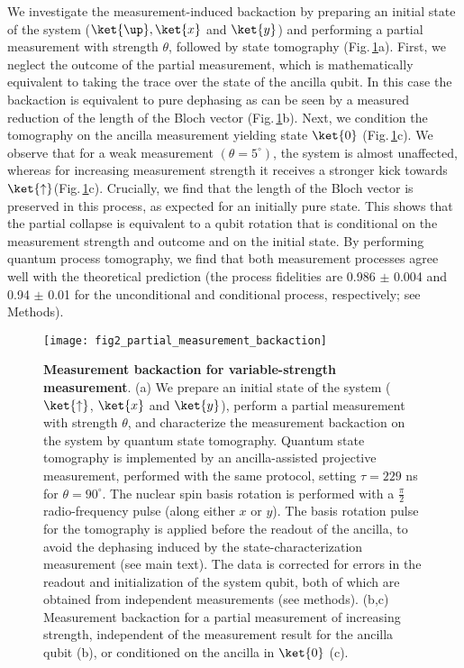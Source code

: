 We investigate the measurement-induced backaction by preparing an initial state of the system ($\ket{\up},\ket{x}$ and $\ket{y}$) and performing a partial measurement with strength $\theta$, followed by state tomography (Fig.\,\ref{fig:amc-fig2}a). First, we neglect the outcome of the partial measurement, which is mathematically equivalent to taking the trace over the state of the ancilla qubit. In this case the backaction is equivalent to pure dephasing as can be seen by a measured reduction of the length of the Bloch vector (Fig.\,\ref{fig:amc-fig2}b). Next, we condition the tomography on the ancilla measurement yielding state $\ket{0}$ (Fig.\,\ref{fig:amc-fig2}c). We observe that for a weak measurement $(\theta = 5^{\circ})$, the system is almost unaffected, whereas for increasing measurement strength it receives a stronger kick towards $\ket{\uparrow} $(Fig.\,\ref{fig:amc-fig2}c). Crucially, we find that the length of the Bloch vector is preserved in this process, as expected for an initially pure state. This shows that the partial collapse is equivalent to a qubit rotation that is conditional on the measurement strength and outcome and on the initial state. By performing quantum process tomography, we find that both measurement processes agree well with the theoretical prediction (the process fidelities are 0.986 $\pm$ 0.004 and 0.94 $\pm$ 0.01 for the unconditional and conditional process, respectively; see Methods).


\begin{figure}
	\centering
	\texttt{[image: fig2\_partial\_measurement\_backaction]}
	\caption{\label{fig:amc-fig2} \textbf{Measurement backaction for variable-strength measurement}. (a) We prepare an initial state  of the system ($\ket{\uparrow}$,  $\ket{x}$ and  $\ket{y}$), perform a partial measurement with strength $\theta$, and characterize the measurement backaction on the system by quantum state tomography. Quantum state tomography is implemented by an ancilla-assisted projective measurement, performed with the same protocol, setting $\tau = 229$ ns for $\theta = 90^{\circ}$. The nuclear spin basis rotation is performed with a $\frac{\pi}{2}$ radio-frequency pulse (along either $x$ or $y$). The basis rotation pulse for the tomography is applied before the readout of the ancilla, to avoid the dephasing induced by the state-characterization measurement (see main text). The data is corrected for errors in the readout and initialization of the system qubit, both of which are obtained from independent measurements (see methods). (b,c)  Measurement backaction for a partial measurement of increasing strength, independent of the measurement result for the ancilla qubit (b), or conditioned on the ancilla in  $\ket{0}$ (c). }
\end{figure}

